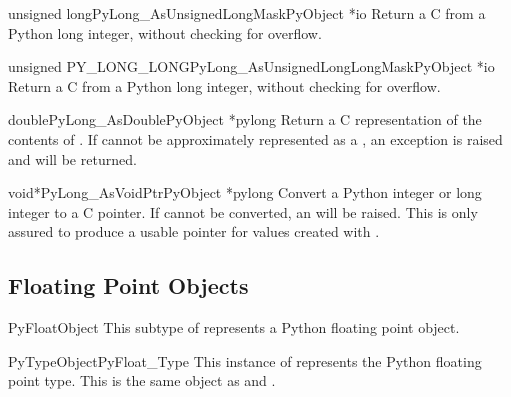 \begin{cfuncdesc}{unsigned long}{PyLong_AsUnsignedLongMask}{PyObject *io}
  Return a C  from a Python long integer, without
  checking for overflow.
\end{cfuncdesc}

\begin{cfuncdesc}{unsigned PY_LONG_LONG}{PyLong_AsUnsignedLongLongMask}{PyObject *io}
  Return a C  from a Python long integer, without
  checking for overflow.
\end{cfuncdesc}

\begin{cfuncdesc}{double}{PyLong_AsDouble}{PyObject *pylong}
  Return a C  representation of the contents of
  .  If  cannot be approximately represented
  as a , an  exception is
  raised and  will be returned.
\end{cfuncdesc}

\begin{cfuncdesc}{void*}{PyLong_AsVoidPtr}{PyObject *pylong}
  Convert a Python integer or long integer  to a C
   pointer.  If  cannot be converted, an
   will be raised.  This is only assured to
  produce a usable  pointer for values created with
  .
\end{cfuncdesc}


\subsection{Floating Point Objects \label{floatObjects}}

\begin{ctypedesc}{PyFloatObject}
  This subtype of  represents a Python floating point
  object.
\end{ctypedesc}

\begin{cvardesc}{PyTypeObject}{PyFloat_Type}
  This instance of  represents the Python floating
  point type.  This is the same object as  and
  .
\end{cvardesc}

